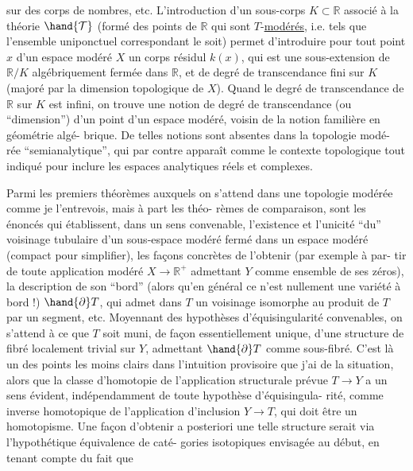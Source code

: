 
sur des corps de nombres, etc. L'introduction d'un sous-corps
$K \subset \mathbb{R}$ associé à la théorie $\hand{\mathcal{T}}$ (formé des points de $\mathbb{R}$ qui sont
$T$-\uline{modérés}, i.e. tels que l'ensemble uniponctuel correspondant le
soit) permet d'introduire pour tout point $x$ d'un espace modéré
$X$ un corps résidul $k(x)$, qui est une sous-extension de $\mathbb{R}/K$
algébriquement fermée dans $\mathbb{R}$, et de degré de transcendance fini
sur $K$ (majoré par la dimension topologique de $X$). Quand le
degré de transcendance de $\mathbb{R}$ sur $K$ est infini, on trouve une
notion de degré de transcendance (ou ``dimension'') d'un point d'un
espace modéré, voisin de la notion familière en géométrie algé-%
brique. De telles notions sont absentes dans la topologie modé-%
rée ``semianalytique'', qui par contre apparaît comme le contexte
topologique tout indiqué pour inclure les espaces analytiques réels
et complexes.

Parmi les premiers théorèmes auxquels on s'attend dans
\margin{/}une topologie modérée comme je l'entrevois, mais\hand{/} à part les théo-%
rèmes de comparaison, sont les énoncés qui établissent, dans un
sens convenable, l'existence et l'unicité ``du'' voisinage tubulaire
d'un sous-espace modéré fermé dans un espace modéré (compact pour
simplifier), les façons concrètes de l'obtenir (par exemple à par-%
tir de toute application modéré $X \longrightarrow \mathbb{R}^{+}$ admettant $Y$ comme
ensemble de ses zéros), la description de son ``bord'' (alors qu'en
général ce n'est nullement une variété à bord !) $\hand{\partial}T$, qui admet
dans $T$ un voisinage isomorphe au produit de $T$ par un segment,
etc. Moyennant des hypothèses d'équisingularité convenables, on
s'attend à ce que $T$ soit muni, de façon essentiellement unique,
d'une structure de fibré localement trivial sur $Y$, admettant $\hand{\partial}T$
comme sous-fibré. C'est là un des points les moins clairs dans
l'intuition provisoire que j'ai de la situation, alors que la
classe d'homotopie de l'application structurale prévue $T \longrightarrow Y$
a un sens évident, indépendamment de toute hypothèse d'équisingula-%
rité, comme inverse homotopique de l'application d'inclusion $Y \longrightarrow T$,
qui doit être un homotopisme. Une façon d'obtenir a posteriori
une telle structure serait via l'hypothétique équivalence de caté-%
gories isotopiques envisagée au début, en tenant compte du fait que

